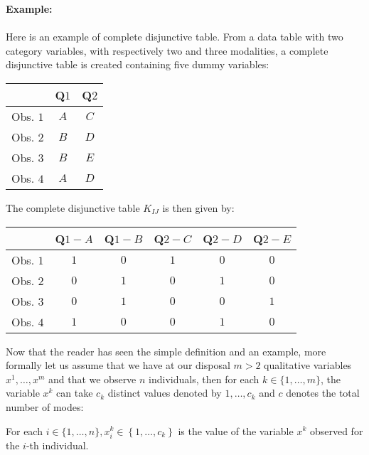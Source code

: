 	\begin{tcolorbox}[colframe=black,colback=white,sharp corners,breakable]
	\textbf{{\Large {}}Example:}\\\\
	Here is an example of complete disjunctive table. From a data table with two category variables, with respectively two and three modalities, a complete disjunctive table is created containing five dummy variables:
	\begin{table}[H]
		\centering
		\begin{tabular}{|c|c|c|}
		\hline 
		\rowcolor[gray]{0.75} & Q$1$ & Q$2$ \\
		\hline Obs. $1$ & $A$ & $C$ \\
		\hline Obs. $2$ & $B$ & $D$ \\
		\hline Obs. $3$ & $B$ & $E$ \\
		\hline Obs. $4$ & $A$ & $D$ \\
		\hline
		\end{tabular}
	\end{table}
	The complete disjunctive table $K_{IJ}$ is then given by:
	\begin{table}[H]
		\centering
		\begin{tabular}{|l|c|c|c|c|c|}
		\hline
		\rowcolor[gray]{0.75} & Q${1-{A}}$ & Q$1-B$ & Q$2-C$ & Q$2-D$ & Q$2-E$ \\
		\hline Obs. $1$ & $1$ & $0$ & $1$ & $0$ & $0$ \\
		\hline Obs. $2$ & $0$ & $1$ & $0$ & $1$ & $0$ \\
		\hline Obs. $3$ & $0$ & $1$ & $0$ & $0$ & $1$ \\
		\hline Obs. $4$ & $1$ & $0$ & $0$ & $1$ & $0$ \\
		\hline
		\end{tabular}
	\end{table}
	\end{tcolorbox}
	
	Now that the reader has seen the simple definition and an example, more formally let us assume that we have at our disposal $m>2$ qualitative variables $x^{1}, \ldots, x^{m}$ and that we observe $n$ individuals, then for each $k \in\{1, \ldots, m\}$, the variable $x^{k}$ can take $c_{k}$ distinct values denoted by $1, \ldots, c_{k}$ and $c$ denotes the total number of modes:
	
	For each $i \in\{1, \ldots, n\}, x_{i}^{k} \in\left\{1, \ldots, c_{k}\right\}$ is the value of the variable $x^{k}$ observed for the $i$-th individual.

